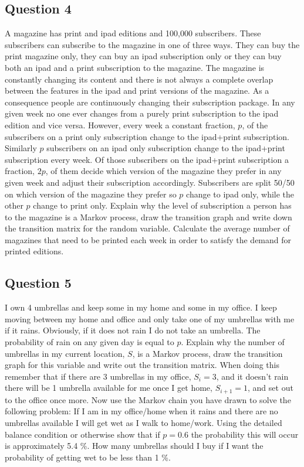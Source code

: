 \documentclass[a4paper]{article}
\begin{document}
\subsection{Question 4}


A magazine has print and ipad editions and 100,000 subscribers. These
subscribers can subscribe to the magazine in
one of three ways. They can buy the print magazine only, they can buy an ipad
subscription only or they can buy both an ipad and a print subscription to the
magazine.  The magazine is constantly changing its content and there is not
always a complete overlap between the features in the ipad and print versions of
the magazine.  As a consequence people are continuously changing their
subscription package. In any given week no one ever changes from a
purely print subscription to the ipad edition and vice versa.  However, every
week a constant fraction, $p$, of the subscribers on a print only subscription
change to the ipad+print subscription.  Similarly $p$ subscribers on
an ipad only subscription change to the ipad+print subscription every week. Of
those subscribers on the ipad+print subscription a fraction, $2p$, of them
decide which version of the magazine they prefer in any given week and adjust
their subscription accordingly. Subscribers are split 50/50 on which version of
the magazine they prefer so $p$ change to ipad only, while the other $p$
change to print only.  Explain why the level of subscription a person has to
the magazine is a Markov process, draw the transition graph and write down the
transition matrix for the random variable. Calculate the average number of
magazines
that need to be printed each week in order to satisfy the demand for printed
editions.

\subsection{Question 5}

I own 4 umbrellas and keep some in my home and some in my
office.  I keep moving between my home and office and only take one of my
umbrellas with me if it rains.  Obviously, if it does not rain I do not take an
umbrella. The probability of rain on any given day is equal to $p$. Explain
why the number of umbrellas in my current location, $S$, is a Markov process,
draw the transition graph for this variable and write out the transition matrix.
When doing this remember that if there are 3 umbrellas in my office, $S_i=3$,
and it doesn't rain there will be 1 umbrella available for me once I get home,
$S_{i+1}=1$, and set out to the office once more.
Now use the Markov chain you have drawn to solve the following problem:
If I am in my office/home when it rains and there are no
umbrellas available I will get wet as I walk to home/work.  Using the
detailed balance condition or otherwise show that if $p=0.6$ the probability
this will occur is approximately 5.4 \%.  How many umbrellas should I buy if I
want the probability of getting wet to be less than 1 \%.
\end{document}
